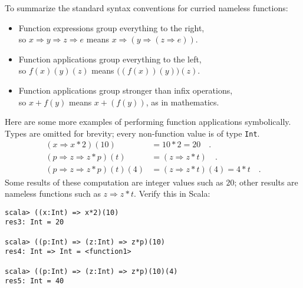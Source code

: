 To summarize the standard syntax conventions for curried nameless
functions:
\begin{itemize}
\item Function expressions group everything to the right,\\
so $x\Rightarrow y\Rightarrow z\Rightarrow e$ means $x\Rightarrow\left(y\Rightarrow\left(z\Rightarrow e\right)\right)$.
\item Function applications group everything to the left,\\
so $f(x)(y)(z)$ means $\big((f(x))(y)\big)(z)$.
\item Function applications group stronger than infix operations,\\
so $x+f(y)$ means $x+(f(y))$, as in mathematics.
\end{itemize}
Here are some more examples of performing function applications symbolically.
Types are omitted for brevity; every non-function value is of type
\texttt{}\lstinline!Int!.
\begin{align*}
\left(x\Rightarrow x*2\right)(10) & =10*2=20\quad.\\
\left(p\Rightarrow z\Rightarrow z*p\right)\left(t\right) & =(z\Rightarrow z*t)\quad.\\
\left(p\Rightarrow z\Rightarrow z*p\right)(t)(4) & =(z\Rightarrow z*t)(4)=4*t\quad.
\end{align*}
Some results of these computation are integer values such as $20$;
other results are nameless functions such as $z\Rightarrow z*t$.
Verify this in Scala:
\begin{lstlisting}
scala> ((x:Int) => x*2)(10)
res3: Int = 20

scala> ((p:Int) => (z:Int) => z*p)(10)
res4: Int => Int = <function1>

scala> ((p:Int) => (z:Int) => z*p)(10)(4)
res5: Int = 40 
\end{lstlisting}

